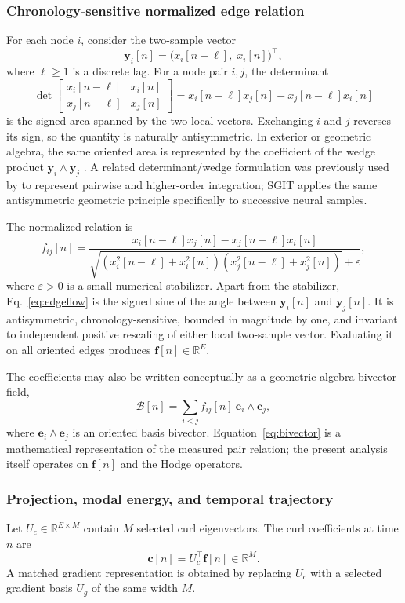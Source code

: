 \documentclass[12pt]{article}
\newcommand{\R}{\mathbb{R}}
\begin{document}
\subsubsection{Chronology-sensitive normalized edge relation}
For each node $i$, consider the two-sample vector
\[
\bm y_i[n]=\big(x_i[n-\ell],\;x_i[n]\big)^{\top},
\]
where $\ell\ge1$ is a discrete lag. For a node pair $i,j$, the determinant
\[
\det\!\begin{bmatrix}
x_i[n-\ell]&x_i[n]\\
x_j[n-\ell]&x_j[n]
\end{bmatrix}
=x_i[n-\ell]x_j[n]-x_j[n-\ell]x_i[n]
\]
is the signed area spanned by the two local vectors. Exchanging $i$ and $j$ reverses its sign, so the quantity is naturally antisymmetric. In exterior or geometric algebra, the same oriented area is represented by the coefficient of the wedge product $\bm y_i\wedge\bm y_j$ \citep{HestenesSobczyk1984,Lavor2018}. A related determinant/wedge formulation was previously used by \citet{Svitek2024GA} to represent pairwise and higher-order integration; SGIT applies the same antisymmetric geometric principle specifically to successive neural samples.

The normalized relation is
\begin{equation}
f_{ij}[n]=
\frac{x_i[n-\ell]x_j[n]-x_j[n-\ell]x_i[n]}
{\sqrt{\left(x_i^2[n-\ell]+x_i^2[n]\right)
\left(x_j^2[n-\ell]+x_j^2[n]\right)}+\varepsilon},
\label{eq:edgeflow}
\end{equation}
where $\varepsilon>0$ is a small numerical stabilizer. Apart from the stabilizer, Eq.~\ref{eq:edgeflow} is the signed sine of the angle between $\bm y_i[n]$ and $\bm y_j[n]$. It is antisymmetric, chronology-sensitive, bounded in magnitude by one, and invariant to independent positive rescaling of either local two-sample vector. Evaluating it on all oriented edges produces $\bm f[n]\in\R^E$.

The coefficients may also be written conceptually as a geometric-algebra bivector field,
\begin{equation}
\mathcal B[n]=\sum_{i<j} f_{ij}[n]~\bm e_i\wedge\bm e_j,
\label{eq:bivector}
\end{equation}
where $\bm e_i\wedge\bm e_j$ is an oriented basis bivector. Equation~\ref{eq:bivector} is a mathematical representation of the measured pair relation; the present analysis itself operates on $\bm f[n]$ and the Hodge operators.

\subsubsection{Projection, modal energy, and temporal trajectory}
Let $U_c\in\R^{E\times M}$ contain $M$ selected curl eigenvectors. The curl coefficients at time $n$ are
\begin{equation}
\bm c[n]=U_c^{\top}\bm f[n]\in\R^M.
\label{eq:projection}
\end{equation}
A matched gradient representation is obtained by replacing $U_c$ with a selected gradient basis $U_g$ of the same width $M$.
\end{document}
